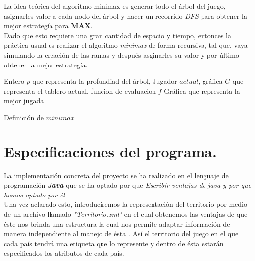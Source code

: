 \documentclass[12pt,twocolumn,draft]{article}
\begin{document}
La idea te\'orica del algoritmo minimax es generar todo el \'arbol del juego, asignarles valor a cada
nodo del \'arbol y hacer un recorrido \textit{DFS} para obtener la mejor estrateg\'ia para \textbf{MAX}.\\

Dado que esto requiere una gran cantidad de espacio y tiempo, entonces la pr\'actica usual es realizar
el algoritmo \textit{minimax} de forma recursiva, tal que, vaya simulando la creaci\'on de las ramas y despu\'es
asginarles su valor y por \'ultimo obtener la mejor estrateg\'ia.\\

\begin{algorithm}
\begin{algorithmic}[1]
\REQUIRE Entero $p$ que representa la profundiad del \'arbol, Jugador $actual$, gr\'afica $G$ que representa el tablero actual,
funcion de evaluacion $f$
\ENSURE  Gr\'afica que representa la mejor jugada
\ELSE
{}
\ENDIF
{}
\ELSE
{}
\ENDIF
\ELSE
{}
\ENDIF
\ENDIF
\ENDFOR
\ENDIF
{}
\end{algorithmic}
\caption{Definici\'on de $minimax$}
\label{minimax}
\end{algorithm}



\section{Especificaciones del programa.}

La implementaci\'on concreta del proyecto se ha realizado en el lenguaje de programaci\'on \textbf{\textit{Java}}\cite{JAVA} que se ha optado por que \textit{Escribir ventajas de java y por que hemos optado por \'el}\\

Una vez aclarado esto, introduciremos la representaci\'on del territorio por medio de un archivo llamado \textit{"Territorio.xml"} en el cual obtenemos las ventajas de que \'este nos brinda una estructura la cual nos permite adaptar informaci\'on de manera independiente al manejo de \'esta \cite{xml}. As\'i el territorio del juego en el que cada pa\'is tendr\'a una etiqueta que lo represente y dentro de \'esta estar\'an especificados los atributos de cada pa\'is.\\
\end{document}
